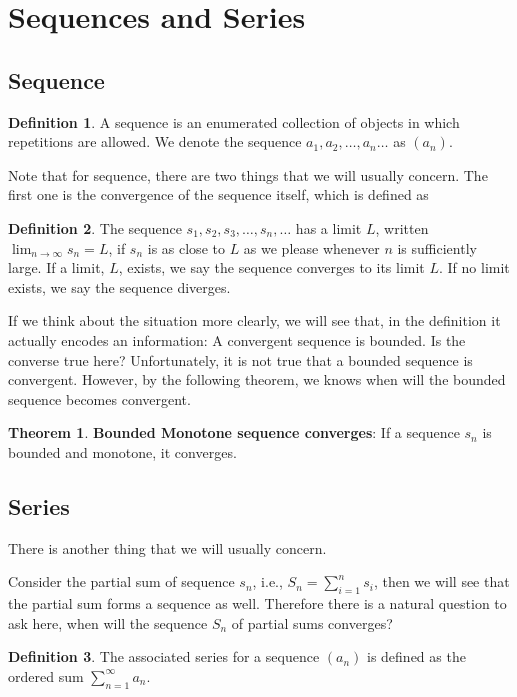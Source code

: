 \documentclass[12pt]{article}
\theoremstyle{definition}
\newtheorem{thm}{Theorem}[section]
\theoremstyle{definition}
\newtheorem{definition}{Definition}[section]
\theoremstyle{remark}
\theoremstyle{definition}
\theoremstyle{definition}
\theoremstyle{definition}
\begin{document}
\section{Sequences and Series}
\subsection{Sequence}
\begin{definition}
	A sequence is an enumerated collection of objects in which repetitions are allowed. We denote the sequence $a_1, a_2, \ldots, a_n \ldots $ as $(a_n)$.

\end{definition}	

Note that for sequence, there are two things that we will usually concern. The first one is the convergence of the sequence itself, which is defined as 

\begin{definition}
The sequence $s_1, s_2, s_3, \ldots , s_n, \ldots$ has a limit $L$, written $\lim_{n \to \infty}s_n = L$, if $s_n$ is as close to
$L$ as we please whenever $n$ is sufficiently large. If a limit, $L$, exists, we say the sequence
converges to its limit $L$. If no limit exists, we say the sequence diverges.
\end{definition}

If we think about the situation more clearly, we will see that, in the definition it actually encodes an information: A convergent sequence is bounded. Is the converse true here? Unfortunately, it is not true that a bounded sequence is convergent. However, by the following theorem, we knows when will the bounded sequence becomes convergent.

\begin{thm}
\textbf{Bounded Monotone sequence converges}: If a sequence $s_n$ is bounded and monotone, it converges.
\end{thm}

\newpage
\subsection{Series}
There is another thing that we will usually concern.

Consider the partial sum of sequence $s_n$, i.e., $S_n=\sum_{i=1}^{n}s_i$, then we will see that the partial sum forms a sequence as well. Therefore there is a natural question to ask here, when will the sequence $S_n$ of partial sums converges?


\begin{definition}
The associated series for a sequence $(a_n)$ is defined as the ordered sum $\sum_{n=1}^{\infty}a_n$.
\end{definition}
\end{document}
